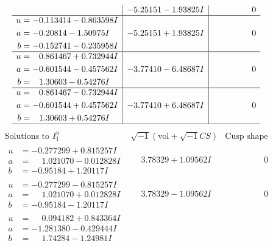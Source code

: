\documentclass[1p]{elsarticle_modified}
\theoremstyle{definition}
\newcommand{\I}{\sqrt{-1}}
\begin{document}
$$\begin{array}{c|c|c}
 & -5.25151 - 1.93825 I & \phantom{-0.000000 } 0 \\ \hline\begin{aligned}
u &= -0.113414 - 0.863598 I \\
a &= -0.20814 - 1.50975 I \\
b &= -0.152741 - 0.235958 I\end{aligned}
 & -5.25151 + 1.93825 I & \phantom{-0.000000 } 0 \\ \hline\begin{aligned}
u &= \phantom{-}0.861467 + 0.732944 I \\
a &= -0.601544 - 0.457562 I \\
b &= \phantom{-}1.30603 - 0.54276 I\end{aligned}
 & -3.77410 - 6.48687 I & \phantom{-0.000000 } 0 \\ \hline\begin{aligned}
u &= \phantom{-}0.861467 - 0.732944 I \\
a &= -0.601544 + 0.457562 I \\
b &= \phantom{-}1.30603 + 0.54276 I\end{aligned}
 & -3.77410 + 6.48687 I & \phantom{-0.000000 } 0\\
 \hline 
 \end{array}$$\newpage$$\begin{array}{c|c|c}  
\text{Solutions to }I^u_{1}& \I (\text{vol} + \sqrt{-1}CS) & \text{Cusp shape}\\
 \hline 
\begin{aligned}
u &= -0.277299 + 0.815257 I \\
a &= \phantom{-}1.021070 - 0.012828 I \\
b &= -0.95184 + 1.20117 I\end{aligned}
 & \phantom{-}3.78329 + 1.09562 I & \phantom{-0.000000 } 0 \\ \hline\begin{aligned}
u &= -0.277299 - 0.815257 I \\
a &= \phantom{-}1.021070 + 0.012828 I \\
b &= -0.95184 - 1.20117 I\end{aligned}
 & \phantom{-}3.78329 - 1.09562 I & \phantom{-0.000000 } 0 \\ \hline\begin{aligned}
u &= \phantom{-}0.094182 + 0.843364 I \\
a &= -1.281380 - 0.429444 I \\
b &= \phantom{-}1.74284 - 1.24981 I\end{aligned}

\end{array}$$
\end{document}
